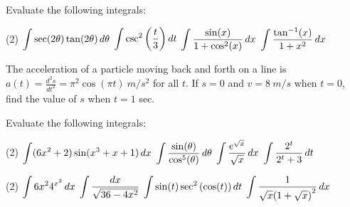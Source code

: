 \documentclass[answers]{exam}
\begin{document}
  \begin{ex*}
    Evaluate the following integrals:
  \end{ex*}
  \begin{tasks}[after-item-skip=\stretch{1}](2)
    \task $\displaystyle\int\sec(2\theta)\tan(2\theta)\,d\theta$
    \task $\displaystyle\int\csc^2{\left(\frac{t}{3}\right)}\,dt$
    \task $\displaystyle\int \frac{\sin(x)}{1+\cos^2(x)}\,dx$
    \task $\displaystyle\int \frac{\tan^{-1}(x)}{1+x^2}\,dx$
  \end{tasks}
  
  \noindent
  The acceleration of a particle moving back and forth on a line is $a(t)=\frac{d^2s}{dt^2}=\pi^2\cos(\pi t)\ m/s^2$ for all $t$. If $s=0$ and $v=8\ m/s$ when $t=0$, find the value of $s$ when $t=1$ sec.
  \pagebreak
  
  \begin{ex*}
    Evaluate the following integrals:
  \end{ex*}
  \begin{tasks}[after-item-skip=\stretch{1}](2)
    \task $\displaystyle\int(6x^2+2)\sin(x^3+x+1)\,dx$
    \task $\displaystyle\int \frac{\sin(\theta)}{\cos^5(\theta)}\,d\theta$
    \task $\displaystyle\int \frac{e^{\sqrt{x}}}{\sqrt x}\,dx$
    \task $\displaystyle\int \frac{2^t}{2^t+3}\,dt$
  \end{tasks}
  \pagebreak
  
  \begin{tasks}[after-item-skip=\stretch{1}, resume](2)
    \task $\displaystyle\int 6x^2 4^{x^3}\,dx$
    \task $\displaystyle\int \frac{dx}{\sqrt{36-4x^2}}$
    \task $\displaystyle\int \sin(t)\sec^2{\left(\cos(t)\right)}\,dt$
    \task $\displaystyle\int \frac{1}{\sqrt{x}{\left(1+\sqrt{x}\right)}^2}\,dx$
  \end{tasks}
  \pagebreak
\end{document}
